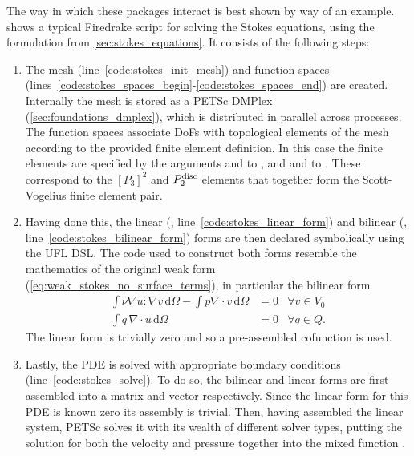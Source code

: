 \documentclass[thesis]{subfiles}
\begin{document}
The way in which these packages interact is best shown by way of an example.
 shows a typical Firedrake script for solving the Stokes equations, using the formulation from \cref{sec:stokes_equations}.
It consists of the following steps:
\begin{enumerate}
  \item
    The mesh (line~\ref{code:stokes_init_mesh}) and function spaces (lines~\ref{code:stokes_spaces_begin}-\ref{code:stokes_spaces_end}) are created.
    Internally the mesh is stored as a PETSc DMPlex (\cref{sec:foundations_dmplex}), which is distributed in parallel across processes.
    The function spaces associate DoFs with topological elements of the mesh according to the provided finite element definition.
    In this case the finite elements are specified by the arguments  and  to , and  and  to .
    These correspond to the $[P_3]^2$ and $P_2^{\textnormal{disc}}$ elements that together form the Scott-Vogelius finite element pair.

  \item
    Having done this, the linear (, line~\ref{code:stokes_linear_form}) and bilinear (, line~\ref{code:stokes_bilinear_form}) forms are then declared symbolically using the UFL DSL.
    The code used to construct both forms resemble the mathematics of the original weak form (\cref{eq:weak_stokes_no_surface_terms}), in particular the bilinear form
    \begin{equation}
      \begin{aligned}
        \int \nu \nabla u : \nabla v \, \textrm{d}\Omega
        - \int p \nabla \cdot v \, \textrm{d}\Omega
        &= 0
        &\forall v \in V_0 \\
        \int q \, \nabla \cdot u \, \textrm{d}\Omega
        &= 0
        &\forall q \in Q.
      \end{aligned}
    \end{equation}
    The linear form is trivially zero and so a pre-assembled cofunction is used.

  \item
    Lastly, the PDE is solved with appropriate boundary conditions (line~\ref{code:stokes_solve}).
    To do so, the bilinear and linear forms are first assembled into a matrix and vector respectively.
    Since the linear form for this PDE is known zero its assembly is trivial.
    Then, having assembled the linear system, PETSc solves it with its wealth of different solver types, putting the solution for both the velocity and pressure together into the mixed function .
\end{enumerate}
\end{document}
